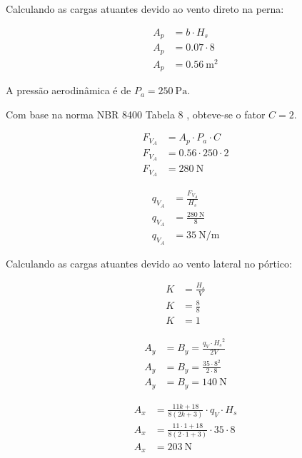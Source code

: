 Calculando as cargas atuantes devido ao vento direto na perna:

\begin{align*}
  A_p & = b \cdot H_s                 \\
  A_p & = \num{0.07} \cdot 8          \\
  A_p & = \boxed{\SI{0.56}{\meter^2}}
\end{align*}

A pressão aerodinâmica é de $P_a = \SI{250}{\pascal}$.

Com base na norma NBR 8400 Tabela 8 \cite{nbr8400}, obteve-se o fator $C = 2$.

\begin{align*}
  F_{V_A} & = A_p \cdot P_a \cdot C              \\
  F_{V_A} & = \num{0.56} \cdot \num{250} \cdot 2 \\
  F_{V_A} & = \boxed{\SI{280}{\newton}}
\end{align*}

\begin{align*}
  q_{V_A} & = \frac{F_{V_A}}{H_s}                \\
  q_{V_A} & = \frac{\SI{280}{\newton}}{8}        \\
  q_{V_A} & = \boxed{\SI{35}{\newton\per\meter}}
\end{align*}

Calculando as cargas atuantes devido ao vento lateral no pórtico:

\begin{align*}
  K & = \frac{H_s}{V} \\
  K & = \frac{8}{8}   \\
  K & = \boxed{1}
\end{align*}

\begin{align*}
  A_y & = B_y = \frac{q_V \cdot {H_s}^2}{2 V}          \\
  A_y & = B_y = \frac{\num{35} \cdot {8}^2}{2 \cdot 8} \\
  A_y & = B_y = \boxed{\SI{140}{\newton}}
\end{align*}

\begin{align*}
  A_x & = \frac{11 k + 18}{8 \left( 2 k + 3 \right)} \cdot q_V \cdot H_s                \\
  A_x & = \frac{11 \cdot 1 + 18}{8 \left( 2 \cdot 1 + 3 \right)} \cdot \num{35} \cdot 8 \\
  A_x & = \boxed{\SI{203}{\newton}}
\end{align*}

